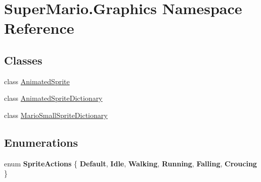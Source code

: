 \hypertarget{namespace_super_mario_1_1_graphics}{}\section{Super\+Mario.\+Graphics Namespace Reference}
\label{namespace_super_mario_1_1_graphics}
\subsection*{Classes}
\begin{DoxyCompactItemize}
\item 
class \mbox{\hyperlink{class_super_mario_1_1_graphics_1_1_animated_sprite}{Animated\+Sprite}}
\item 
class \mbox{\hyperlink{class_super_mario_1_1_graphics_1_1_animated_sprite_dictionary}{Animated\+Sprite\+Dictionary}}
\item 
class \mbox{\hyperlink{class_super_mario_1_1_graphics_1_1_mario_small_sprite_dictionary}{Mario\+Small\+Sprite\+Dictionary}}
\end{DoxyCompactItemize}
\subsection*{Enumerations}
\begin{DoxyCompactItemize}
\item 
\mbox{\label{namespace_super_mario_1_1_graphics_ae4f4372bb75546bd6055162321094766}} 
enum {\bfseries Sprite\+Actions} \{ \newline
{\bfseries Default}, 
{\bfseries Idle}, 
{\bfseries Walking}, 
{\bfseries Running}, 
\newline
{\bfseries Falling}, 
{\bfseries Croucing}
 \}
\end{DoxyCompactItemize}
